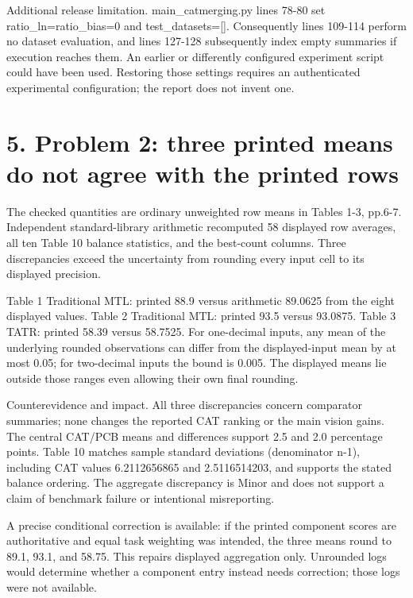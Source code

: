 \documentclass[10pt]{article}
\begin{document}
Additional release limitation. main\_catmerging.py lines 78-80 set ratio\_ln=ratio\_bias=0 and test\_datasets=[]. Consequently lines 109-114 perform no dataset evaluation, and lines 127-128 subsequently index empty summaries if execution reaches them. An earlier or differently configured experiment script could have been used. Restoring those settings requires an authenticated experimental configuration; the report does not invent one.\par
\section*{5. Problem 2: three printed means do not agree with the printed rows}
The checked quantities are ordinary unweighted row means in Tables 1-3, pp.6-7. Independent standard-library arithmetic recomputed 58 displayed row averages, all ten Table 10 balance statistics, and the best-count columns. Three discrepancies exceed the uncertainty from rounding every input cell to its displayed precision.\par
Table 1 Traditional MTL: printed 88.9 versus arithmetic 89.0625 from the eight displayed values. Table 2 Traditional MTL: printed 93.5 versus 93.0875. Table 3 TATR: printed 58.39 versus 58.7525. For one-decimal inputs, any mean of the underlying rounded observations can differ from the displayed-input mean by at most 0.05; for two-decimal inputs the bound is 0.005. The displayed means lie outside those ranges even allowing their own final rounding.\par
Counterevidence and impact. All three discrepancies concern comparator summaries; none changes the reported CAT ranking or the main vision gains. The central CAT/PCB means and differences support 2.5 and 2.0 percentage points. Table 10 matches sample standard deviations (denominator n-1), including CAT values 6.2112656865 and 2.5116514203, and supports the stated balance ordering. The aggregate discrepancy is Minor and does not support a claim of benchmark failure or intentional misreporting.\par
A precise conditional correction is available: if the printed component scores are authoritative and equal task weighting was intended, the three means round to 89.1, 93.1, and 58.75. This repairs displayed aggregation only. Unrounded logs would determine whether a component entry instead needs correction; those logs were not available.\par
\end{document}
